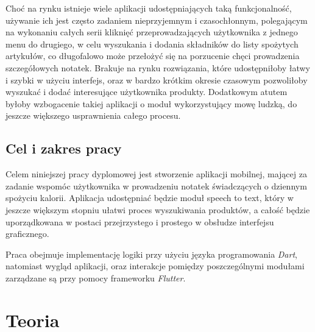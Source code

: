 \documentclass[12pt, a4paper]{article}
\begin{document}
\begin{sloppypar}
{{    Choć na rynku istnieje wiele aplikacji udostępniających taką funkcjonalność,
    używanie ich jest często zadaniem nieprzyjemnym i czasochłonnym, polegającym
    na wykonaniu całych serii kliknięć przeprowadzających użytkownika z jednego menu
    do drugiego, w celu wyszukania i dodania składników do listy spożytych artykułów,
    co długofalowo może przełożyć się na porzucenie chęci prowadzenia szczegółowych
    notatek. Brakuje na rynku rozwiązania, które udostępniłoby łatwy i szybki
    w użyciu interfejs, oraz w bardzo krótkim okresie czasowym pozwoliłoby wyszukać 
    i dodać interesujące użytkownika produkty. Dodatkowym atutem byłoby wzbogacenie
    takiej aplikacji o moduł wykorzystujący mowę ludzką, do jeszcze większego 
    usprawnienia całego procesu.
  }
  \subsection{Cel i zakres pracy}
  {
    Celem niniejszej pracy dyplomowej jest stworzenie aplikacji mobilnej, mającej 
    za zadanie wspomóc użytkownika w prowadzeniu notatek świadczących o dziennym
    spożyciu kalorii. Aplikacja udostępniać będzie moduł speech to text,
    który w jeszcze większym stopniu ułatwi proces wyszukiwania produktów, a całość
    będzie uporządkowana w postaci przejrzystego i prostego w obsłudze interfejsu
    graficznego.

    Praca obejmuje implementację logiki przy użyciu języka programowania \emph{Dart},
    natomiast wygląd aplikacji, oraz interakcje pomiędzy poszczególnymi modułami
    zarządzane są przy pomocy frameworku \emph{Flutter}.
  }

}

\section{Teoria}
{
}
\end{sloppypar}
\end{document}
